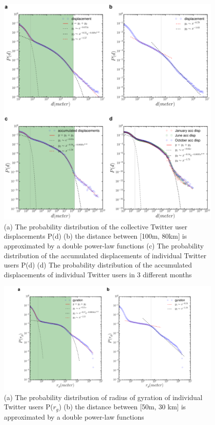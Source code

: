 \documentclass[ijgi,article,submit,moreauthors,pdftex,10pt,a4paper]{mdpi}
\theoremstyle{mdpi}
\newcounter{re}
\theoremstyle{mdpidefinition}
\begin{document}
\begin{figure}[h]
\centering
\includegraphics[width=1.0\linewidth]{./figures/displacement}
\caption{(a) The probability distribution of the collective Twitter user displacements P(d) (b) the distance between [100m, 80km] is approximated by a double power-law functions (c) The probability distribution of the accumulated displacements of individual Twitter users P(d) (d) The probability distribution of the accumulated displacements of individual Twitter users in 3 different months}
\label{fig:Arch}
\end{figure}
\FloatBarrier

\begin{figure}[h]
\centering
\includegraphics[width=1.0\linewidth]{./figures/gyration}
\caption{ (a) The probability distribution of radius of gyration of individual Twitter users P($r_{g}$) (b) the distance between [50m, 30 km] is approximated by a double power-law functions}
\label{fig:Arch}
\end{figure}
\FloatBarrier
\end{document}
